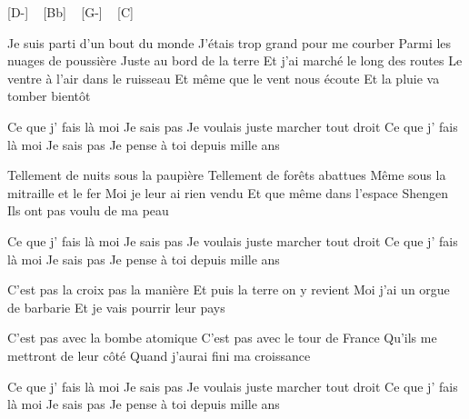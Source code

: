 
[D-] ~ [Bb] ~ [G-]  ~ [C]~ 

Je suis parti d'un bout du monde
J'étais trop grand pour me courber
Parmi les nuages de poussière
Juste au bord de la terre
Et j'ai marché le long des routes
Le ventre à l'air dans le ruisseau
Et même que le vent nous écoute
Et la pluie va tomber bientôt

Ce que j' fais là moi
Je sais pas
Je voulais juste marcher tout droit
Ce que j' fais là moi
Je sais pas
Je pense à toi depuis mille ans


Tellement de nuits sous la paupière
Tellement de forêts abattues
Même sous la mitraille et le fer
Moi je leur ai rien vendu
Et que même dans l'espace Shengen
Ils ont pas voulu de ma peau

Ce que j' fais là moi
Je sais pas
Je voulais juste marcher tout droit
Ce que j' fais là moi
Je sais pas
Je pense à toi depuis mille ans

C'est pas la croix pas la manière
Et puis la terre on y revient
Moi j'ai un orgue de barbarie
Et je vais pourrir leur pays

C'est pas avec la bombe atomique
C'est pas avec le tour de France
Qu'ils me mettront de leur côté
Quand j'aurai fini ma croissance

Ce que j' fais là moi
Je sais pas
Je voulais juste marcher tout droit
Ce que j' fais là moi
Je sais pas
Je pense à toi depuis mille ans